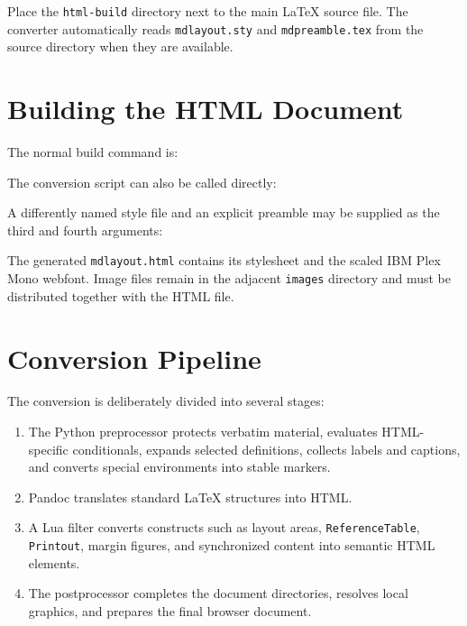 \documentclass[
11pt,
a4paper,
oneside
]{scrbook}
\begin{document}
Place the \texttt{html-build} directory next to the main \LaTeX{} source file.
The converter automatically reads \texttt{mdlayout.sty} and
\texttt{mdpreamble.tex} from the source directory when they are available.

\section{Building the HTML Document}

The normal build command is:






The conversion script can also be called directly:






A differently named style file and an explicit preamble may be supplied as the
third and fourth arguments:






The generated \texttt{mdlayout.html} contains its stylesheet and the scaled
IBM Plex Mono webfont. Image files remain in the adjacent \texttt{images}
directory and must be distributed together with the HTML file.

\section{Conversion Pipeline}

The conversion is deliberately divided into several stages:

\begin{enumerate}
	\item The Python preprocessor protects verbatim material, evaluates
	HTML-specific conditionals, expands selected definitions, collects labels
	and captions, and converts special environments into stable markers.
	\item Pandoc translates standard \LaTeX{} structures into HTML.
	\item A Lua filter converts \MDWordmark constructs such as layout areas,
	\texttt{ReferenceTable}, \texttt{Printout}, margin figures, and synchronized
	content into semantic HTML elements.
	\item The postprocessor completes the document directories, resolves local
	graphics, and prepares the final browser document.
\end{enumerate}
\end{document}
